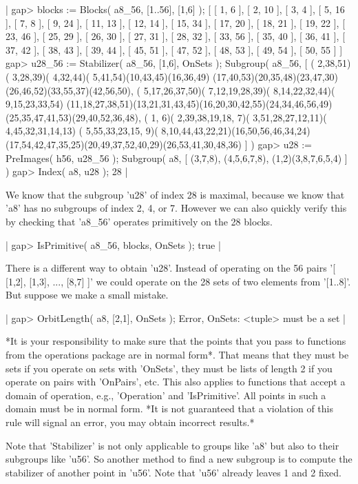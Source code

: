 |    gap> blocks := Blocks( a8_56, [1..56], [1,6] );
    [ [ 1, 6 ], [ 2, 10 ], [ 3, 4 ], [ 5, 16 ], [ 7, 8 ], [ 9, 24 ],
      [ 11, 13 ], [ 12, 14 ], [ 15, 34 ], [ 17, 20 ], [ 18, 21 ],
      [ 19, 22 ], [ 23, 46 ], [ 25, 29 ], [ 26, 30 ], [ 27, 31 ],
      [ 28, 32 ], [ 33, 56 ], [ 35, 40 ], [ 36, 41 ], [ 37, 42 ],
      [ 38, 43 ], [ 39, 44 ], [ 45, 51 ], [ 47, 52 ], [ 48, 53 ],
      [ 49, 54 ], [ 50, 55 ] ]
    gap> u28_56 := Stabilizer( a8_56, [1,6], OnSets );
    Subgroup( a8_56,
    [ ( 2,38,51)( 3,28,39)( 4,32,44)( 5,41,54)(10,43,45)(16,36,49)
        (17,40,53)(20,35,48)(23,47,30)(26,46,52)(33,55,37)(42,56,50),
      ( 5,17,26,37,50)( 7,12,19,28,39)( 8,14,22,32,44)( 9,15,23,33,54)
        (11,18,27,38,51)(13,21,31,43,45)(16,20,30,42,55)(24,34,46,56,49)
        (25,35,47,41,53)(29,40,52,36,48),
      ( 1, 6)( 2,39,38,19,18, 7)( 3,51,28,27,12,11)( 4,45,32,31,14,13)
        ( 5,55,33,23,15, 9)( 8,10,44,43,22,21)(16,50,56,46,34,24)
        (17,54,42,47,35,25)(20,49,37,52,40,29)(26,53,41,30,48,36) ] )
    gap> u28 := PreImages( h56, u28_56 );
    Subgroup( a8, [ (3,7,8), (4,5,6,7,8), (1,2)(3,8,7,6,5,4) ] )
    gap> Index( a8, u28 );
    28 |

We know that the subgroup 'u28' of  index 28 is  maximal, because we know
that 'a8' has  no subgroups of  index 2,  4, or  7.  However  we can also
quickly verify this by checking that 'a8\_56' operates primitively on the
28 blocks.

|    gap> IsPrimitive( a8_56, blocks, OnSets );
    true |

There is a different way to obtain 'u28'.  Instead of operating on the 56
pairs  '[ [1,2], [1,3], ..., [8,7] ]' we  could operate on the 28 sets of
two elements from '[1..8]'.  But suppose we make a small mistake.

|    gap> OrbitLength( a8, [2,1], OnSets );
    Error, OnSets: <tuple> must be a set |

*It is your responsibility to make sure that the  points that you pass to
functions from the operations  package are in normal form*.   That  means
that they must be sets if you operate on sets with 'OnSets', they must be
lists of length 2 if you operate on pairs with 'OnPairs', etc.  This also
applies to functions that accept a domain of operation, e.g., 'Operation'
and 'IsPrimitive'.  All points in such a domain must be in  normal  form.
*It is not guaranteed that a violation of this rule will signal an error,
you may obtain incorrect results.*

Note  that 'Stabilizer'  is not only applicable to groups like  'a8'  but
also  to their  subgroups  like  'u56'.  So another  method to find a new
subgroup  is  to compute the  stabilizer of another point in 'u56'.  Note
that 'u56' already leaves 1 and 2 fixed.

